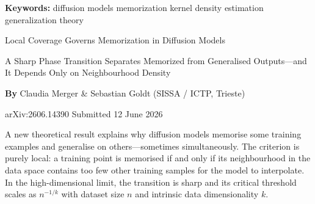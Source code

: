 \documentclass[10pt,twocolumn]{article}
\begin{document}
\setlength{\parindent}{0pt}
\setlength{\parskip}{4pt}

{\small\color{keywordgray}\textbf{Keywords:}
  diffusion models \textbullet{}
  memorization \textbullet{}
  kernel density estimation \textbullet{}
  generalization theory}\par\vspace{4pt}

{\LARGE\bfseries\raggedright
  Local Coverage Governs Memorization in Diffusion Models}\par\vspace{4pt}

{\large\itshape\raggedright
  A Sharp Phase Transition Separates Memorized from Generalised Outputs---and
  It Depends Only on Neighbourhood Density}\par\vspace{6pt}

{\small\textbf{By} Claudia Merger \& Sebastian Goldt
  (SISSA / ICTP, Trieste)}\par\vspace{2pt}

{\small\color{keywordgray}arXiv:2606.14390 \textbullet{} Submitted 12 June 2026}
\par\vspace{2pt}\noindent{\color{rulered}\rule{\columnwidth}{0.6pt}}\vspace{6pt}

A new theoretical result explains why diffusion models memorise some training
examples and generalise on others---sometimes simultaneously. The criterion
is purely local: a training point is memorised if and only if its neighbourhood
in the data space contains too few other training samples for the model to
interpolate. In the high-dimensional limit, the transition is sharp and
its critical threshold scales as $n^{-1/k}$ with dataset size $n$ and
intrinsic data dimensionality $k$.
\end{document}
